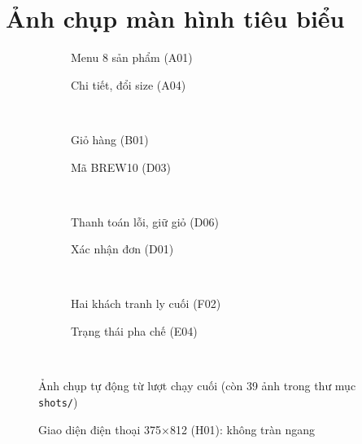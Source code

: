 \documentclass[a4paper,11pt]{article}
\begin{document}
\section{Ảnh chụp màn hình tiêu biểu}
\begin{figure}[H]\centering
\begin{subfigure}{0.46\textwidth}\caption{Menu 8 sản phẩm (A01)}\end{subfigure}\hfill
\begin{subfigure}{0.46\textwidth}\caption{Chi tiết, đổi size (A04)}\end{subfigure}\\[6pt]
\begin{subfigure}{0.46\textwidth}\caption{Giỏ hàng (B01)}\end{subfigure}\hfill
\begin{subfigure}{0.46\textwidth}\caption{Mã BREW10 (D03)}\end{subfigure}\\[6pt]
\begin{subfigure}{0.46\textwidth}\caption{Thanh toán lỗi, giữ giỏ (D06)}\end{subfigure}\hfill
\begin{subfigure}{0.46\textwidth}\caption{Xác nhận đơn (D01)}\end{subfigure}\\[6pt]
\begin{subfigure}{0.46\textwidth}\caption{Hai khách tranh ly cuối (F02)}\end{subfigure}\hfill
\begin{subfigure}{0.46\textwidth}\caption{Trạng thái pha chế (E04)}\end{subfigure}\\[6pt]
\caption{Ảnh chụp tự động từ lượt chạy cuối (còn 39 ảnh trong thư mục \texttt{shots/})}\end{figure}
\begin{figure}[H]\centering
{}\hspace{4pt}\hspace{4pt}
\caption{Giao diện điện thoại 375×812 (H01): không tràn ngang}\end{figure}
\end{document}
